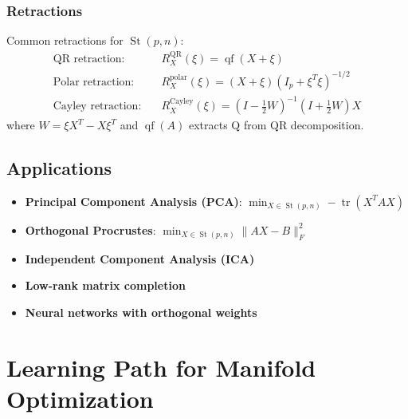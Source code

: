 \documentclass[11pt]{article}
\begin{document}
\subsubsection{Retractions}
Common retractions for $\operatorname{St}(p, n)$:
\begin{align*}
    \text{QR retraction:} & \quad R_X^{\text{QR}}(\xi) = \operatorname{qf}(X + \xi) \\
    \text{Polar retraction:} & \quad R_X^{\text{polar}}(\xi) = (X + \xi)(I_p + \xi^T \xi)^{-1/2} \\
    \text{Cayley retraction:} & \quad R_X^{\text{Cayley}}(\xi) = (I - \tfrac{1}{2}W)^{-1}(I + \tfrac{1}{2}W)X
\end{align*}
where $W = \xi X^T - X\xi^T$ and $\operatorname{qf}(A)$ extracts Q from QR decomposition.

\subsection{Applications}
\begin{itemize}
    \item \textbf{Principal Component Analysis (PCA)}: $\min_{X \in \operatorname{St}(p, n)} -\operatorname{tr}(X^T A X)$
    \item \textbf{Orthogonal Procrustes}: $\min_{X \in \operatorname{St}(p, n)} \|AX - B\|_F^2$
    \item \textbf{Independent Component Analysis (ICA)}
    \item \textbf{Low-rank matrix completion}
    \item \textbf{Neural networks with orthogonal weights}
\end{itemize}

\section{Learning Path for Manifold Optimization}
\end{document}
